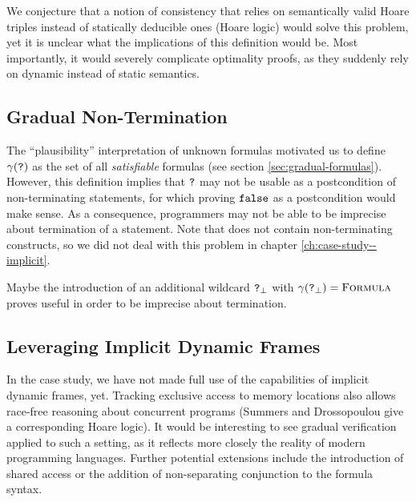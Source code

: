 \begin{comment}
INTERESTING! Regarding “when does optimal det. lift. imply opt. pred. lift.”
For above example, the gradual formula syntax would have to provide a way of saying that there is NOT MORE knowledge about x hidden in ?.
This way, the gradual implication of x = 4 would (as expected) fail, as the optimal predicate would
\end{comment}

We conjecture that a notion of consistency that relies on semantically valid Hoare triples instead of statically deducible ones (Hoare logic) would solve this problem, yet it is unclear what the implications of this definition would be.
Most importantly, it would severely complicate optimality proofs, as they suddenly rely on dynamic instead of static semantics.

\subsection{Gradual Non-Termination}%
The “plausibility” interpretation of unknown formulas motivated us to define $\gamma(\textup{\texttt{?}})$ as the set of all \emph{satisfiable} formulas \setFormulaA (see section \ref{sec:gradual-formulas}).
However, this definition implies that $\textup{\texttt{?}}$ may not be usable as a postcondition of non-terminating statements, for which proving $\textup{\texttt{false}}$ as a postcondition would make sense.
As a consequence, programmers may not be able to be imprecise about termination of a statement.
Note that \svlidf does not contain non-terminating constructs, so we did not deal with this problem in chapter \ref{ch:case-study--implicit}.

Maybe the introduction of an additional wildcard $\textup{\texttt{?}}_{\bot}$ with $\gamma(\textup{\texttt{?}}_{\bot}) = \textup{\textsc{Formula}}$ proves useful in order to be imprecise about termination.

\subsection{Leveraging Implicit Dynamic Frames}%
In the case study, we have not made full use of the capabilities of implicit dynamic frames, yet.
Tracking exclusive access to memory locations also allows race-free reasoning about concurrent programs (Summers and Drossopoulou \cite{summers2013formal} give a corresponding Hoare logic).
It would be interesting to see gradual verification applied to such a setting, as it reflects more closely the reality of modern programming languages.
Further potential extensions include the introduction of shared access or the addition of non-separating conjunction to the formula syntax.

